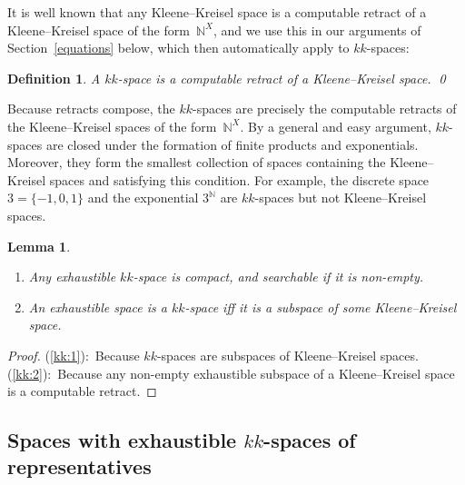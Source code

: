 \documentclass[10pt]{article}
\newtheorem{lemma}[cor]{Lemma}
\newtheorem{Def}[cor]{Definition}
\newenvironment{definition}{\begin{Def}\em}{\end{Def}}
\newcommand{\N}{\mathbb{N}}
\begin{document}
It is well known that any Kleene--Kreisel space is a computable
retract of a Kleene--Kreisel space of the form~$\N^X$, and we use this
in our arguments of Section~\ref{equations} below, which then
automatically apply to $kk$-spaces:
\begin{definition}
  A \emph{$kk$-space} is a computable retract of a Kleene--Kreisel
  space. \qed
\end{definition}
\noindent
Because retracts compose, the $kk$-spaces are precisely the computable
retracts of the Kleene--Kreisel spaces of the form~$\N^X$.  By a
general and easy argument, $kk$-spaces are closed under the formation
of finite products and exponentials.  Moreover, they form the smallest
collection of spaces containing the Kleene--Kreisel spaces and
satisfying this condition. For example, the discrete space
$3=\{-1,0,1\}$ and the exponential $3^\N$ are $kk$-spaces but not
Kleene--Kreisel spaces.
\begin{lemma} \label{kk:subspace} \leavevmode
  \begin{enumerate}
  \item \label{kk:1} Any exhaustible $kk$-space is compact, and
    searchable if it is non-empty.
\item \label{kk:2} An exhaustible space is a $kk$-space iff
  it is a subspace of some Kleene--Kreisel space.
  \end{enumerate}
\end{lemma}
\begin{proof}
  (\ref{kk:1}):~Because $kk$-spaces are subspaces of Kleene--Kreisel
  spaces. (\ref{kk:2}):~Because any non-empty exhaustible subspace of
  a Kleene--Kreisel space is a computable retract.
\end{proof}

\subsection{Spaces with exhaustible $kk$-spaces of representatives}
\label{kk:exhaustible:section}
\end{document}
